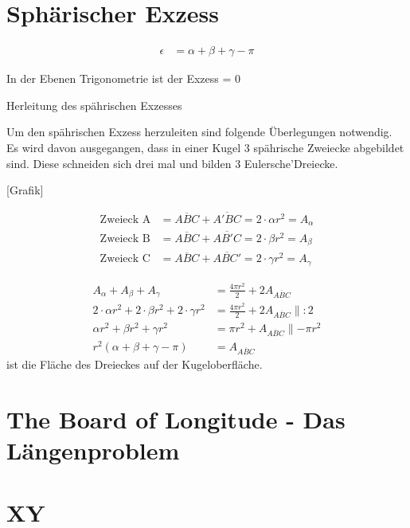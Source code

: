 \begin{refsection}
\section{Sphärischer Exzess}

\begin{align*}
\epsilon &= \alpha + \beta + \gamma - \pi
\end{align*}

In der Ebenen Trigonometrie ist der Exzess = 0

Herleitung des spährischen Exzesses

Um den spährischen Exzess herzuleiten sind 
folgende Überlegungen notwendig.
Es wird davon ausgegangen, dass in einer Kugel
3 spährische Zweiecke abgebildet sind. Diese schneiden
sich drei mal und bilden 3 Eulersche’Dreiecke.


[Grafik]

\begin{align*}
\text{Zweieck A}
&=
\overline{ABC} + \overline{A'BC} = 2\cdot \alpha r^{ 2 } = A_{ \alpha }\\
\text{Zweieck B}
&=
\overline{ABC} + \overline{AB'C} = 2\cdot \beta r^{ 2 } = A_{ \beta }\\
\text{Zweieck C}
&=
\overline{ABC} + \overline{ABC'} = 2\cdot \gamma r^{ 2 } = A_{ \gamma }
\end{align*}

\begin{align*}
A_{ \alpha } + A_{ \beta } + A_{ \gamma }
&=
\frac{ 4\pi r^{ 2 } }{ 2 } + 2A_{ \overline{ ABC }} 
\\
2\cdot \alpha r^{ 2 } + 2\cdot \beta r^{ 2 } + 2\cdot \gamma r^{ 2 }
&=
\frac{ 4\pi r^{ 2 } }{ 2 } + 2A_{ \overline{ ABC }} \parallel:2
\\
\alpha r^{ 2 } + \beta r^{ 2 } + \gamma r^{ 2 }
&=
\pi r^{ 2 } + A_{ \overline{ ABC }} \parallel-\pi r^{ 2 }
\\
r^{ 2 } \left(\alpha + \beta + \gamma - \pi\right)
&=
A_{ \overline{ ABC }}
\end{align*}
ist die Fläche des Dreieckes auf der Kugeloberfläche.



\section{The Board of Longitude - Das Längenproblem}


\section{XY}






\end{refsection}
